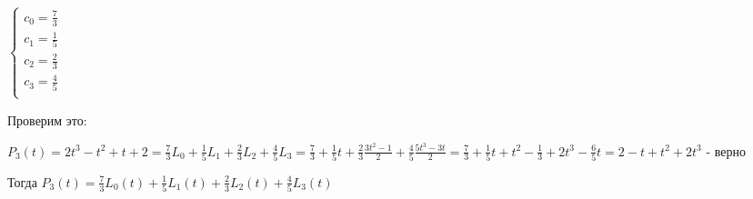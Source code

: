 \begin{enumerate}
\begin{multicols}{3}
    $\displaystyle \begin{cases}
         c_0 = \frac{7}{3} \\
         c_1 = \frac{1}{5} \\
         c_2 = \frac{2}{3} \\
         c_3 = \frac{4}{5} \\
    \end{cases}$
    \end{multicols}

    \vspace{5mm}

    Проверим это:

    $\displaystyle P_3(t) = 2t^3 - t^2 + t + 2 = \frac{7}{3}L_0 + \frac{1}{5}L_1 + \frac{2}{3}L_2 + \frac{4}{5}L_3 =
    \frac{7}{3} + \frac{1}{5}t + \frac{2}{3}\frac{3t^2 - 1}{2} + \frac{4}{5}\frac{5t^3 - 3t}{2} =
    \frac{7}{3} + \frac{1}{5}t + t^2 - \frac{1}{3} + 2t^3 - \frac{6}{5}t = 2 - t + t^2 + 2t^3$ - верно

    \vspace{5mm}

    Тогда $\displaystyle P_3(t) = \frac{7}{3}L_0(t) + \frac{1}{5}L_1(t) + \frac{2}{3}L_2(t) + \frac{4}{5}L_3(t)$
\end{enumerate}

